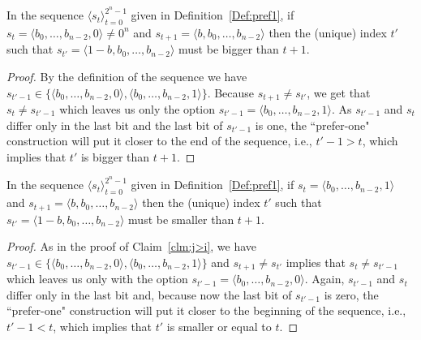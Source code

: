 \documentclass[final,12pt]{elsarticle}
\theoremstyle{definition} \newtheorem{definition}[theorem]{Definition} \newtheorem{observation}[theorem]{Observation} \newtheorem{example}[theorem]{Example} \newtheorem{remark}[theorem]{Remark} \newtheorem{corrolary}[theorem]{Corrolary}
\newcommand{\REF}[2]{#1~\ref{#2}}
\newcommand{\T}[1]{\langle{#1}\rangle} \DeclareMathOperator{\drop}{drop} \DeclareMathOperator{\dropbits}{drop\_bits} \DeclareMathOperator{\dropstates}{drop\_states} \DeclareMathOperator{\leadingForm}{LeadingForm} \DeclareMathOperator{\dv}{div} %
\begin{document}
\begin{claim}
	\label{clm:j>i} In the sequence $
		\T{s_t}_{t=0}^{2^n-1}$ given in \REF{Definition}{Def:pref1}, if $s_t=\T{b_0,\dots,b_{n-2},0} \neq 0^n$ and $s_{t+1}=\T{b,b_0,\dots,b_{n-2}}$ then the (unique) index $t'$ such that $s_{t'}=\T{1-b,b_0,\dots,b_{n-2}}$ must be bigger than $t+1$.
\end{claim}
\begin{proof}
	By the definition of the sequence we have $s_{t'-1} \in \{ \T{b_0,\dots,b_{n-2},0}, \T{b_0,\dots,b_{n-2},1}\}$. Because $s_{t+1} \neq s_{t'}$, we get that $s_{t} \neq s_{t'-1}$ which leaves us only the option $s_{t'-1}=\T{b_0,\dots,b_{n-2},1}$. As $s_{t'-1}$ and $s_{t}$ differ only in the last bit and the last bit of $s_{t'-1}$ is one, the ``prefer-one" construction will put it closer to the end of the sequence, i.e., $t'-1 > t$, which implies that $t'$ is bigger than $t+1$.
\end{proof}

\begin{claim}
	\label{clm:j<i} In the sequence $
		\T{s_t}_{t=0}^{2^n-1}$ given in	\REF{Definition}{Def:pref1}, if $s_t=\T{b_0,\dots,b_{n-2},1}$ and $s_{t+1}=\T{b,b_0,\dots,b_{n-2}}$ then the (unique) index $t'$ such that $s_{t'}=\T{1-b,b_0,\dots,b_{n-2}}$ must be smaller than $t+1$.
\end{claim}
\begin{proof}
	As in the proof of \REF{Claim}{clm:j>i}, we have $s_{t'-1} \in \{ \T{b_0,\dots,b_{n-2},0}, \T{b_0,\dots,b_{n-2},1}\}$ and $s_{t+1} \neq s_{t'}$ implies that $s_{t} \neq s_{t'-1}$ which leaves us only with the option $s_{t'-1}=\T{b_0,\dots,b_{n-2},0}$. Again, $s_{t'-1}$ and $s_{t}$ differ only in the last bit and, because now the last bit of $s_{t'-1}$ is zero, the ``prefer-one" construction will put it closer to the beginning of the sequence, i.e., $t'-1 < t$, which implies that $t'$ is smaller or equal to $t$.
\end{proof}
\end{document}
